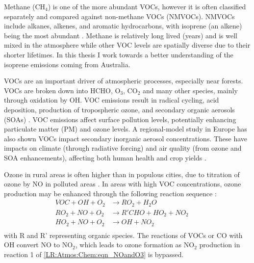   Methane (CH$_4$) is one of the more abundant VOCs, however it is often classified separately and compared against non-methane VOCs (NMVOCs).
  NMVOCs include alkanes, alkenes, and aromatic hydrocarbons, with isoprene (an alkene) being the most abundant \parencite{Guenther1995}.
  Methane is relatively long lived (years) and is well mixed in the atmosphere while other VOC levels are spatially diverse due to their shorter lifetimes.
  In this thesis I work towards a better understanding of the isoprene emissions coming from Australia.

  VOCs are an important driver of atmospheric processes, especially near forests.
  VOCs are broken down into HCHO, O$_3$, CO$_2$ and many other species, mainly through oxidation by OH.
  VOC emissions result in radical cycling, acid deposition, production of tropospheric ozone, and secondary organic aerosols (SOAs) \parencite{Atkinson2000, Kanakidou2005}.
  VOC emissions affect surface pollution levels, potentially enhancing particulate matter (PM) and ozone levels.
  A regional-model study in Europe \parencite{Aksoyoglu2017} has also shown VOCs impact secondary inorganic aerosol concentrations.
  These have impacts on climate (through radiative forcing) and air quality (from ozone and SOA enhancements), affecting both human health and crop yields \parencite{IPCC_Chapter2, Avnery2011, Lelieveld2015}.
  
  Ozone in rural areas is often higher than in populous cities, due to titration of ozone by NO in polluted areas \parencite{Cooper2014,Monks2015}.
  In areas with high VOC concentrations, ozone production may be enhanced through the following reaction sequence \parencite{Sillman1999}:
  \begin{equation}
    \begin{aligned}
      VOC + OH + O_2   & \to RO_2 + H_2O       && \\%
      RO_2 + NO + O_2  & \to R'CHO+HO_2+NO_2   && \\%
      HO_2 + NO + O_2  & \to OH + NO_2         && \\%
    \end{aligned}
    \label{LR:VOCs:eqn_VOCandNO}
  \end{equation}
  with R and R' representing organic species.
  The reactions of VOCs or CO with OH convert NO to NO$_2$, which leads to ozone formation as NO$_2$ production in reaction 1 of \ref{LR:Atmos:Chem:eqn_NOandO3} is bypassed.
  
